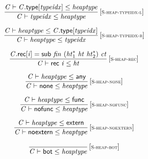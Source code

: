 $$
\begin{array}{@{}c@{}}\displaystyle
\frac{
{\mathit{C}} \vdash {\mathit{C}}.\mathsf{type}[{\mathit{typeidx}}] \leq {\mathit{heaptype}}
}{
{\mathit{C}} \vdash {\mathit{typeidx}} \leq {\mathit{heaptype}}
} \, {[\textsc{\scriptsize S{-}heap{-}typeidx{-}l}]}
\qquad
\end{array}
$$

$$
\begin{array}{@{}c@{}}\displaystyle
\frac{
{\mathit{C}} \vdash {\mathit{heaptype}} \leq {\mathit{C}}.\mathsf{type}[{\mathit{typeidx}}]
}{
{\mathit{C}} \vdash {\mathit{heaptype}} \leq {\mathit{typeidx}}
} \, {[\textsc{\scriptsize S{-}heap{-}typeidx{-}r}]}
\qquad
\end{array}
$$

$$
\begin{array}{@{}c@{}}\displaystyle
\frac{
{\mathit{C}}.\mathsf{rec}[{\mathit{i}}] = \mathsf{sub}~{\mathit{fin}}~({{\mathit{ht}}_{{1}}^\ast}~{\mathit{ht}}~{{\mathit{ht}}_{{2}}^\ast})~{\mathit{ct}}
}{
{\mathit{C}} \vdash \mathsf{rec}~{\mathit{i}} \leq {\mathit{ht}}
} \, {[\textsc{\scriptsize S{-}heap{-}rec}]}
\qquad
\end{array}
$$

$$
\begin{array}{@{}c@{}}\displaystyle
\frac{
{\mathit{C}} \vdash {\mathit{heaptype}} \leq \mathsf{any}
}{
{\mathit{C}} \vdash \mathsf{none} \leq {\mathit{heaptype}}
} \, {[\textsc{\scriptsize S{-}heap{-}none}]}
\qquad
\end{array}
$$

$$
\begin{array}{@{}c@{}}\displaystyle
\frac{
{\mathit{C}} \vdash {\mathit{heaptype}} \leq \mathsf{func}
}{
{\mathit{C}} \vdash \mathsf{nofunc} \leq {\mathit{heaptype}}
} \, {[\textsc{\scriptsize S{-}heap{-}nofunc}]}
\qquad
\end{array}
$$

$$
\begin{array}{@{}c@{}}\displaystyle
\frac{
{\mathit{C}} \vdash {\mathit{heaptype}} \leq \mathsf{extern}
}{
{\mathit{C}} \vdash \mathsf{noextern} \leq {\mathit{heaptype}}
} \, {[\textsc{\scriptsize S{-}heap{-}noextern}]}
\qquad
\end{array}
$$

$$
\begin{array}{@{}c@{}}\displaystyle
\frac{
}{
{\mathit{C}} \vdash \mathsf{bot} \leq {\mathit{heaptype}}
} \, {[\textsc{\scriptsize S{-}heap{-}bot}]}
\qquad
\end{array}
$$

